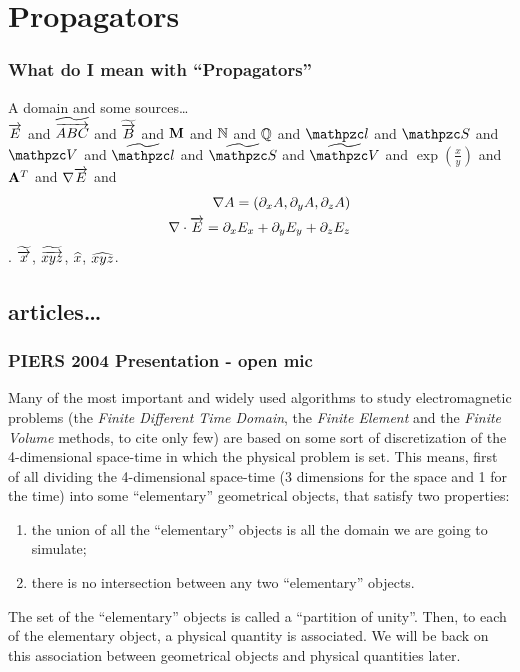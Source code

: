 \part{Propagators}

\section*{What do I mean with ``Propagators''}
A domain and some sources\ldots\\
$\overrightarrow{E}$ and $\widetilde{\overrightarrow{ABC}}$ and $\widetilde{\overrightarrow{B}}$ and $\mathbf{M}$
and $\mathbb{N}$ and $\mathbb{Q}$ and $\Line{l}$ and
$\Surface{S}$ and $\Volume{V}$ and $\DualLine{l}$ and
$\DualSurface{S}$ and $\DualVolume{V}$ and $\exp(\frac{x}{y})$ and
${\mathbf{A}}^T$ and ${\nabla \overrightarrow{E}}$ and
\begin{eqnarray}
  {\nabla A} = \left( \partial_x A, \partial_y A,\partial_z A \right) \\
  {\nabla \cdot \overrightarrow{E}} = \partial_x E_x + \partial_y E_y + \partial_z E_z
\end{eqnarray}.
$\widetilde{\overrightarrow{x}}$, $\widetilde{\overrightarrow{xyz}}$, $\widehat{x}$, $\widehat{xyz}$.



\chapter{articles\ldots}

\section{PIERS 2004 Presentation - open mic}

Many of the most important and widely used algorithms to study
electromagnetic problems (the \emph{Finite Different Time Domain}, the
\emph{Finite Element} and the \emph{Finite Volume} methods, to cite
only few) are based on some sort of discretization of the
4-dimensional space-time in which the physical problem is set. This
means, first of all dividing the 4-dimensional space-time (3 dimensions
for the space and 1 for the time) into some ``elementary'' geometrical
objects, that satisfy two properties:
\begin{enumerate}
\item
  the union of all the ``elementary'' objects is all the domain we are
  going to simulate;
\item
  there is no intersection between any two ``elementary'' objects.
\end{enumerate}
The set of the ``elementary'' objects is called a ``partition of
unity''. Then, to each of the elementary object, a physical quantity
is associated. We will be back on this association between geometrical
objects and physical quantities later.

